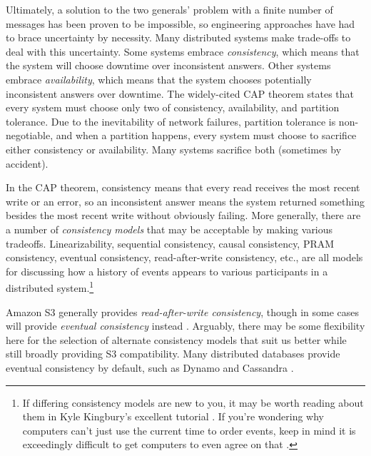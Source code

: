 \documentclass[a4paper,10pt]{article} \usepackage[utf8]{inputenc}
\begin{document}
Ultimately, a solution to the two generals' problem with a finite number of
messages has been proven to be impossible, so engineering approaches have had
to brace uncertainty by necessity. Many distributed systems make trade-offs to
deal with this uncertainty. Some systems embrace {\em consistency}, which means
that the system will choose downtime over inconsistent answers. Other
systems embrace {\em availability}, which means that the system chooses
potentially inconsistent answers over downtime. The widely-cited CAP
theorem \cite{cap} states that every system must choose only two of consistency,
availability, and partition tolerance. Due to the inevitability of network
failures, partition tolerance is non-negotiable, and when a partition happens,
every system must choose to sacrifice either consistency or availability. Many
systems sacrifice both (sometimes by accident).

In the CAP theorem, consistency means that every read receives the most recent
write or an error, so an inconsistent answer means the system returned something
besides the most recent write without obviously failing. More generally, there
are a number of {\em consistency models} that may be acceptable by making
various tradeoffs. Linearizability, sequential consistency, causal consistency,
PRAM consistency, eventual consistency, read-after-write consistency, etc., are
all models for discussing how a history of events appears to various
participants in a distributed system.\footnote{If differing consistency models
are new to you, it may be worth reading about them in Kyle Kingbury's excellent
tutorial \cite{aphyr-consistency}. If you're wondering why computers can't just
use the current time to order events, keep in mind it is exceedingly difficult
to get computers to even agree on that \cite{no-now}.}

Amazon S3 generally provides {\em read-after-write consistency}, though in some
cases will provide {\em eventual consistency} instead \cite{s3-consistency}.
Arguably, there may be some flexibility here for the selection of alternate
consistency models that suit us better while still broadly providing S3
compatibility. Many distributed databases provide eventual consistency by
default, such as Dynamo \cite{dynamo} and Cassandra \cite{cassandra}.
\end{document}
